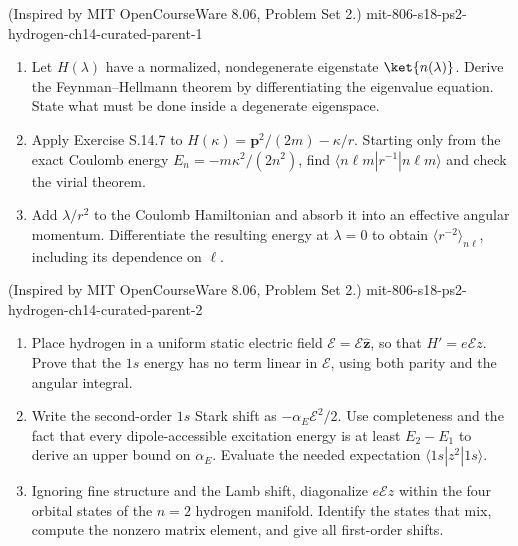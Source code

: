 \begin{enumerate}
  {(Inspired by MIT OpenCourseWare 8.06, Problem Set 2.)}
  {mit-806-s18-ps2-hydrogen-ch14-curated-parent-1}
\begin{enumerate}
\item
Let \(H(\lambda)\) have a normalized, nondegenerate eigenstate
\(\ket{n(\lambda)}\).  Derive the Feynman--Hellmann theorem by
differentiating the eigenvalue equation.  State what must be done inside a
degenerate eigenspace.
\item
Apply Exercise S.14.7 to
\(H(\kappa)=\mathbf p^2/(2m)-\kappa/r\).  Starting only from the exact
Coulomb energy \(E_n=-m\kappa^2/(2n^2)\), find
\(\langle n\ell m|r^{-1}|n\ell m\rangle\) and check the virial theorem.
\item
Add \(\lambda/r^2\) to the Coulomb Hamiltonian and absorb it into an
effective angular momentum.  Differentiate the resulting energy at
\(\lambda=0\) to obtain \(\langle r^{-2}\rangle_{n\ell}\), including its
dependence on \(\ell\).
\end{enumerate}

  {(Inspired by MIT OpenCourseWare 8.06, Problem Set 2.)}
  {mit-806-s18-ps2-hydrogen-ch14-curated-parent-2}
\begin{enumerate}
\item
Place hydrogen in a uniform static electric field
\(\boldsymbol{\mathcal E}=\mathcal E\widehat{\mathbf z}\), so that
\(H'=e\mathcal E z\).  Prove that the \(1s\) energy has no term linear in
\(\mathcal E\), using both parity and the angular integral.
\item
Write the second-order \(1s\) Stark shift as
\(-\alpha_E\mathcal E^2/2\).  Use completeness and the fact that every
dipole-accessible excitation energy is at least \(E_2-E_1\) to derive an
upper bound on \(\alpha_E\).  Evaluate the needed expectation
\(\langle1s|z^2|1s\rangle\).
\item
Ignoring fine structure and the Lamb shift, diagonalize \(e\mathcal E z\)
within the four orbital states of the \(n=2\) hydrogen manifold.  Identify
the states that mix, compute the nonzero matrix element, and give all
first-order shifts.
\end{enumerate}


\end{enumerate}
